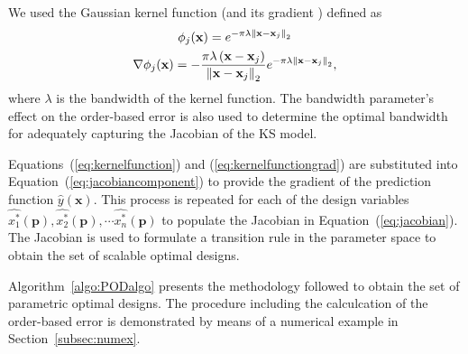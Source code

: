 We used the Gaussian kernel function (and its gradient ) defined as
\begin{gather}
	\label{eq:kernelfunction}
	\phi_j(\mathbf{x}) = e^{-\pi\lambda \left\lVert\mathbf{x}-\mathbf{x}_j\right\rVert_2}\\
	\label{eq:kernelfunctiongrad}
	\nabla\phi_j(\mathbf{x}) = -\dfrac{\pi\lambda\left(\mathbf{x} - \mathbf{x}_j\right)}{\left\lVert\mathbf{x} - \mathbf{x}_j\right\rVert_2}e^{-\pi\lambda \left\lVert\mathbf{x}-\mathbf{x}_j\right\rVert_2},
\end{gather}
where $\lambda$ is the bandwidth of the kernel function. The bandwidth parameter's effect on the order-based error is also used to determine the optimal bandwidth for adequately capturing the Jacobian of the \ac{KS} model.

Equations~(\ref{eq:kernelfunction}) and (\ref{eq:kernelfunctiongrad}) are substituted into Equation~(\ref{eq:jacobiancomponent}) to provide the gradient of the prediction function $\hat{y}(\mathbf{x})$. This process is repeated for each of the design variables $\hat{x_1^*}(\mathbf{p}), \hat{x_2^*}(\mathbf{p}), \cdots \hat{x_n^*}(\mathbf{p})$ to populate the Jacobian in Equation~(\ref{eq:jacobian}). The Jacobian is used to formulate a transition rule in the parameter space to obtain the set of scalable optimal designs.

Algorithm~\ref{algo:PODalgo} presents the methodology followed to obtain the set of parametric optimal designs. The procedure including the calculcation of the order-based error is demonstrated by means of a numerical example in Section~\ref{subsec:numex}.


